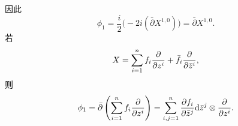     因此
    \begin{equation*}
        \phi_1 = \frac{i}{2}\Big(-2i (\bar{\partial}X^{1,0}) \Big) = \bar{\partial}X^{1,0}.
    \end{equation*}
    若
    \begin{equation*}
        X = \sum_{i=1}^{n} f_i\frac{\partial }{\partial z^i} + \bar{f_i}\frac{\partial }{\partial \bar{z}^i},
    \end{equation*}
    则 
    \begin{equation*}
        \phi_1 = \bar{\partial}\left(\sum_{i=1}^{n} f_i\frac{\partial }{\partial z^i}\right)
        = \sum_{i,j=1}^{n} \frac{\partial f_i}{\partial \bar{z}^j}{\rm d}\bar{z}^j\otimes\frac{\partial }{\partial z^i}.
    \end{equation*}